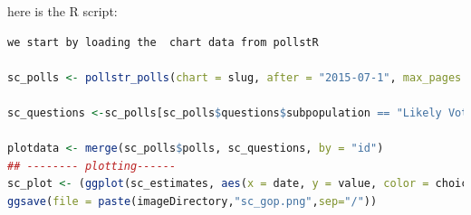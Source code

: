 \documentclass{article}[14pt]
\begin{document}
\begin{section}
\begin{enumerate}[]
here is the R script:
\begin{lstlisting}[language = R]
we start by loading the  chart data from pollstR

sc_polls <- pollstr_polls(chart = slug, after = "2015-07-1", max_pages = 1000000)

sc_questions <-sc_polls[sc_polls$questions$subpopulation == "Likely Voters"] 

plotdata <- merge(sc_polls$polls, sc_questions, by = "id")
## -------- plotting------
sc_plot <- (ggplot(sc_estimates, aes(x = date, y = value, color = choice))+ geom_line())
ggsave(file = paste(imageDirectory,"sc_gop.png",sep="/"))

\end{lstlisting}

\end{enumerate}
\end{section}
\end{document}
